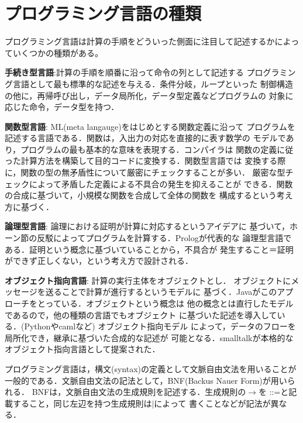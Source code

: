 \documentclass[dvipdfmx,a4j]{jbook}
\begin{document}
\section{プログラミング言語の種類}

プログラミング言語は計算の手順をどういった側面に注目して記述するかによっていくつかの種類がある。

\begin{list}{}{}
  \item {\bf 手続き型言語}:計算の手順を順番に沿って命令の列として記述する
  プログラミング言語として最も標準的な記述を与える．条件分岐，ループといった
  制御構造の他に，再帰呼び出し，データ局所化，データ型定義などプログラムの
  対象に応じた命令，データ型を持つ．
  \item {\bf 関数型言語}: ML(meta langauge)をはじめとする関数定義に沿って
  プログラムを記述する言語である．関数は，入出力の対応を直接的に表す数学の
  モデルであり，プログラムの最も基本的な意味を表現する．コンパイラは
  関数の定義に従った計算方法を構築して目的コードに変換する．関数型言語では
  変換する際に，関数の型の無矛盾性について厳密にチェックすることが多い．
  厳密な型チェックによって矛盾した定義による不具合の発生を抑えることが
  できる．関数の合成に基づいて，小規模な関数を合成して全体の関数を
  構成するという考え方に基づく．
  \item {\bf 論理型言語}: 論理における証明が計算に対応するというアイデアに
  基づいて，ホーン節の反駁によってプログラムを計算する．Prologが代表的な
  論理型言語である．証明という概念に基づいていることから，不具合が
  発生すること＝証明ができず正しくない，という考え方で設計される．
  \item {\bf オブジェクト指向言語}: 計算の実行主体をオブジェクトとし．
  オブジェクトにメッセージを送ることで計算が進行するというモデルに
  基づく．Javaがこのアプローチをとっている．オブジェクトという概念は
  他の概念とは直行したモデルであるので，他の種類の言語でもオブジェクト
  に基づいた記述を導入している．(Pythonやcamlなど) オブジェクト指向モデル
  によって，データのフローを局所化でき，継承に基づいた合成的な記述が
  可能となる．smalltalkが本格的なオブジェクト指向言語として提案された．
\end{list}

プログラミング言語は，構文(syntax)の定義として文脈自由文法を用いることが
一般的である．文脈自由文法の記法として，BNF(Backus Nauer Form)が用いられる．
BNFは，文脈自由文法の生成規則を記述する．生成規則の$\rightarrow$を
$\texttt{::=}$と記載すること，同じ左辺を持つ生成規則は$\texttt{|}$によって
書くことなどが記法が異なる．
\end{document}
